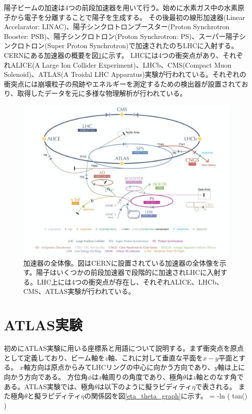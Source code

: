 陽子ビームの加速は4つの前段加速器を用いて行う。始めに水素ガス中の水素原子から電子を分離することで陽子を生成する。
その後最初の線形加速器(Linear Accelarator: LINAC)、陽子シンクロトロンブースター(Proton Synchrotron Booster: PSB)、陽子シンクロトロン(Proton Synchrotron: PS)、スーパー陽子シンクロトロン(Super Proton Synchrotron)で加速されたのちLHCに入射する。CERNにある加速器の概要を図\ref{LHC_overview}に示す。
LHCには4つの衝突点があり、それぞれALICE(A Large Ion Collider Experiment)、LHCb、CMS(Compact Muon Solenoid)、ATLAS(A
Troidal LHC Apparatus)実験が行われている。それぞれの衝突点には崩壊粒子の飛跡やエネルギーを測定するための検出器が設置されており、取得したデータを元に多様な物理解析が行われている。

\begin{figure}[bpt]\centering
\includegraphics[width=12cm]{./LHC_overview.png}
\caption[加速器の全体像]{加速器の全体像\cite{1-1}。図はCERNに設置されている加速器の全体像を示す。陽子はいくつかの前段加速器で段階的に加速されLHCに入射する。LHC上には4つの衝突点が存在し、それぞれALICE、LHCb、CMS、ATLAS実験が行われている。}
\label{LHC_overview}
\end{figure}

\section{ATLAS実験}
初めにATLAS実験に用いる座標系と用語について説明する。まず衝突点を原点として定義しており、ビーム軸を$z$軸、これに対して垂直な平面を$x-y$平面とする。
$x$軸方向は原点からみてLHCリングの中心に向かう方向であり、$y$軸は上に向かう方向である。
方位角$\phi$は$z$軸周りの角度であり、極角$\theta$は$z$軸とのなす角である。ATLAS実験では、極角$\theta$は以下のように擬ラピディティ$\eta$で表される。
また極角$\theta$と擬ラピディティ$\eta$の関係図を図\ref{eta_theta_graph}に示す。
\bbb
\eta = -\rm{ln \left( tan\left(\right) \right) }
\label{eta_theta}
\eee

